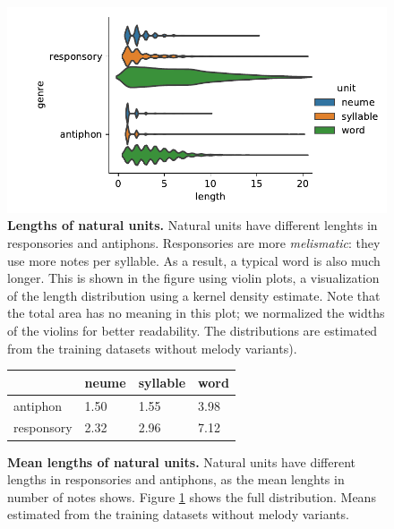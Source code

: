 \documentclass{article}
\begin{document}
\begin{figure}
    \centering
    \includegraphics[width=.6\textwidth]{figs/figS06-unit-length-distribution.pdf}
    \caption{
        \textbf{Lengths of natural units.}
        Natural units have different lenghts in responsories and antiphons.
        Responsories are more \emph{melismatic}: they use more notes per syllable.
        As a result, a typical word is also much longer.
        This is shown in the figure using violin plots, a visualization of the length distribution using a kernel density estimate. Note that the total area has no meaning in this plot; we normalized the widths of the violins for better readability. 
        The distributions are estimated from the training datasets without melody variants).
        \label{suppl:unit-length-distributions}
    }
\end{figure}

\begin{figure}
    \centering
    \begin{tabular}{llll}\toprule
               & neume & syllable & word \\\midrule
    antiphon   & 1.50 & 1.55 & 3.98 \\
    responsory & 2.32 & 2.96 & 7.12 \\ \bottomrule
    \end{tabular}
    \caption{
        \textbf{Mean lengths of natural units.} 
        Natural units have different lengths in responsories and antiphons, as the mean lenghts in number of notes shows. Figure \ref{suppl:unit-length-distributions} shows the full distribution.
        Means estimated from the training datasets without melody variants.
        \label{suppl:unit-lengths}
    }
\end{figure}
\end{document}
